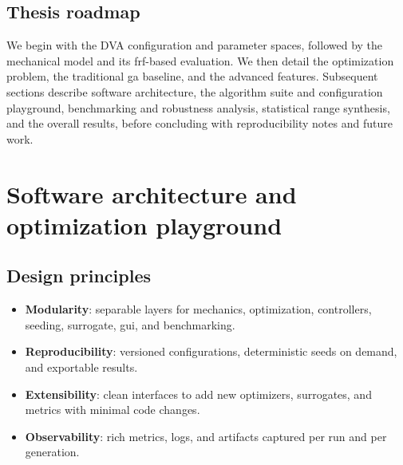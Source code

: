 \documentclass[12pt,a4paper]{article}
\begin{document}
\subsection{Thesis roadmap}
\label{subsec:roadmap}
We begin with the DVA configuration and parameter spaces, followed by the mechanical model and its \gls{frf}-based evaluation. We then detail the optimization problem, the traditional \gls{ga} baseline, and the advanced features. Subsequent sections describe software architecture, the algorithm suite and configuration playground, benchmarking and robustness analysis, statistical range synthesis, and the overall results, before concluding with reproducibility notes and future work.


\section{Software architecture and optimization playground}
\label{sec:architecture}

\subsection{Design principles}
\begin{itemize}
    \item \textbf{Modularity}: separable layers for mechanics, optimization, controllers, seeding, surrogate, \gls{gui}, and benchmarking.
    \item \textbf{Reproducibility}: versioned configurations, deterministic seeds on demand, and exportable results.
    \item \textbf{Extensibility}: clean interfaces to add new optimizers, surrogates, and metrics with minimal code changes.
    \item \textbf{Observability}: rich metrics, logs, and artifacts captured per run and per generation.
\end{itemize}
\end{document}
